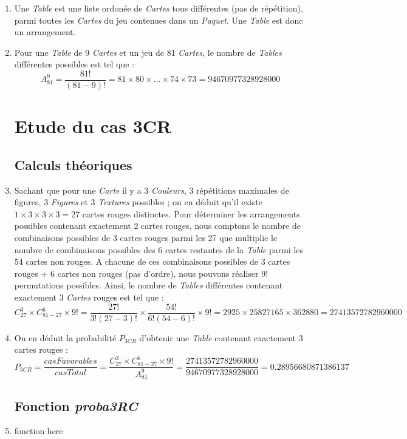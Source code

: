 \documentclass{report}
\begin{document}
\begin{enumerate}
	\item Une \textit{Table} est une liste ordonée de \textit{Cartes} tous différentes (pas de répétition), parmi toutes les \textit{Cartes} du jeu contenues dans un \textit{Paquet}. Une \textit{Table} est donc un arrangement. 
	
	\item Pour une \textit{Table} de 9 \textit{Cartes} et un jeu de 81 \textit{Cartes}, le nombre de \textit{Tables} différentes possibles est tel que : 
	\bigskip
	$$A^{9}_{81} = \frac{81!}{(81-9)!} = 81\times80\times...\times74\times73 = 94670977328928000$$
	
\section{Etude du cas 3CR}
\subsection{Calculs théoriques}
	\item Sachant que pour une \textit{Carte} il y a 3 \textit{Couleurs}, 3 répétitions maximales de figures, 3 \textit{Figures} et 3 \textit{Textures} possibles ; on en déduit qu'il existe $1\times3\times3\times3=27$ cartes rouges distinctes. Pour déterminer les arrangements possibles contenant exactement 2 cartes rouges, nous comptons le nombre de combinaisons possibles de 3 cartes rouges parmi les 27 que multiplie le nombre de combinaisons possibles des 6 cartes restantes de la \textit{Table} parmi les 54 cartes non rouges. A chacune de ces combinaisons possibles de 3 cartes rouges + 6 cartes non rouges (pas d'ordre), nous pouvons réaliser $9!$ permutations possibles. Ainsi, le nombre de \textit{Tables} différentes contenant exactement 3 \textit{Cartes} rouges est tel que :	
	$$C^{3}_{27} \times C^{6}_{81-27} \times 9! = \frac{27!}{3!(27-3)!} \times  \frac{54!}{6!(54-6)!} \times 9! = 2925 \times 25827165 \times 362880 = 27413572782960000$$

	\item On en déduit la probabilité $P_{3CR}$ d'obtenir une \textit{Table} contenant exactement 3 cartes rouges :
	$$P_{3CR} = \dfrac{casFavorables}{casTotal} = \dfrac{C^{3}_{27} \times C^{6}_{81-27} \times 9!}{A^{9}_{81}} = \dfrac{27413572782960000}{94670977328928000} = 0.28956680871386137 $$

\subsection{Fonction \textit{proba3RC}}
	\item fonction here



\end{enumerate}
\end{document}
